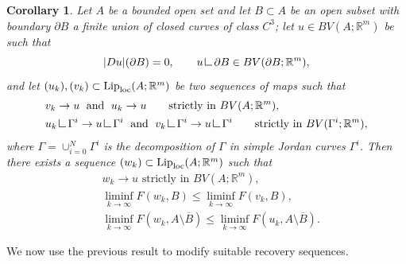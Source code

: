 \documentclass[a4paper,11pt]{article}
\numberwithin{equation}{section}
\newtheorem{cor}[theorem]{Corollary}
\newcommand{\R}{\mathbb{R}}
\newcommand{\res}      {\mathop{\hbox{\vrule height 7pt width .5pt depth
                        0pt\vrule height .5pt width 6pt depth 0pt}}\nolimits}
\begin{document}
\begin{cor}\label{cor_glueing}
	Let $A$ be a bounded open set and let $B\subset A$ be an open subset with boundary  $\partial B$ a finite union of  closed curves of class $C^3$; let $u\in BV(A;\R^m)$ be such that $$|Du|(\partial B)=0,\qquad u\res\partial B\in BV(\partial B;\R^m),$$  and let $(u_k),(v_k)\subset \text{{\rm Lip}}_{\text{{\rm loc}}}(A;\R^m)$ be two sequences of maps such that 
	\begin{align*}
		&v_k\rightarrow u\;\text{ and }\;u_k\rightarrow u \qquad \text{strictly in }BV(A;\R^m),\\
		&u_k\res\Gamma^i\rightarrow u\res \Gamma^i\;\text{ and }\;v_k\res \Gamma^i\rightarrow  u\res \Gamma^i \qquad \text{strictly in }BV(\Gamma^i;\R^m),
	\end{align*}
	where $\Gamma=\cup_{i=0}^N\Gamma^i$ is the decomposition of $\Gamma$ in simple Jordan curves $\Gamma^i$.
	Then there exists a sequence $(w_k)\subset \text{{\rm Lip}}_{\text{{\rm loc}}}(A;\R^m)$ such that 
	\begin{align*}
	&w_k\rightarrow u\text{ strictly in }BV(A;\R^m),\\
	&\liminf_{k\rightarrow\infty}F(w_k,B)\leq \liminf_{k\rightarrow\infty}F(v_k,B),\\
	&\liminf_{k\rightarrow\infty}F(w_k,A\setminus \overline B)\leq \liminf_{k\rightarrow\infty}F(u_k,A\setminus \overline B).
	\end{align*} 
\end{cor}

We now use the previous result to modify suitable recovery sequences.
\end{document}
